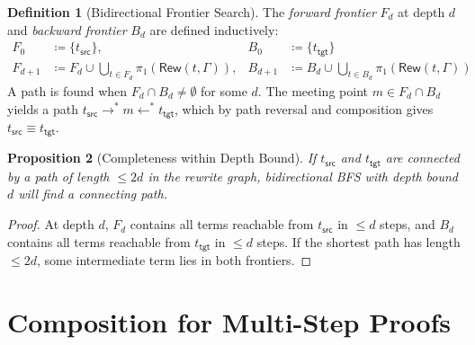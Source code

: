 \documentclass[11pt,a4paper]{report}
\theoremstyle{definition}
\newtheorem{definition}{Definition}[chapter]
\theoremstyle{plain}
\newtheorem{proposition}[definition]{Proposition}
\begin{document}
\begin{definition}[Bidirectional Frontier Search]
\label{def:bidir-bfs}
The \emph{forward frontier} $F_d$ at depth $d$ and \emph{backward
frontier} $B_d$ are defined inductively:
\begin{align}
  F_0 &\coloneqq \{t_{\mathsf{src}}\}, &
  B_0 &\coloneqq \{t_{\mathsf{tgt}}\} \\
  F_{d+1} &\coloneqq F_d \cup
    \bigcup_{t \in F_d} \pi_1(\mathsf{Rew}(t, \Gamma)), &
  B_{d+1} &\coloneqq B_d \cup
    \bigcup_{t \in B_d} \pi_1(\mathsf{Rew}(t, \Gamma))
\end{align}
A path is found when $F_d \cap B_d \neq \emptyset$ for some $d$.
The meeting point $m \in F_d \cap B_d$ yields a path
$t_{\mathsf{src}} \to^* m \leftarrow^* t_{\mathsf{tgt}}$, which
by path reversal and composition gives
$t_{\mathsf{src}} \equiv t_{\mathsf{tgt}}$.
\end{definition}

\begin{proposition}[Completeness within Depth Bound]
If $t_{\mathsf{src}}$ and $t_{\mathsf{tgt}}$ are connected by a path
of length $\leq 2d$ in the rewrite graph, bidirectional BFS with
depth bound $d$ will find a connecting path.
\end{proposition}

\begin{proof}
At depth $d$, $F_d$ contains all terms reachable from
$t_{\mathsf{src}}$ in $\leq d$ steps, and $B_d$ contains all terms
reachable from $t_{\mathsf{tgt}}$ in $\leq d$ steps.  If the shortest
path has length $\leq 2d$, some intermediate term lies in both
frontiers.
\end{proof}

\section{Composition for Multi-Step Proofs}
\end{document}
